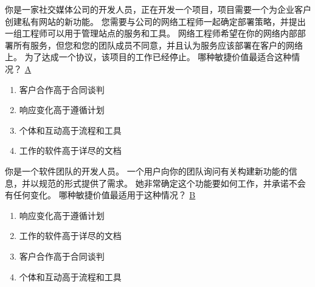 \begin{problem}
	你是一家社交媒体公司的开发人员，正在开发一个项目，项目需要一个为企业客户创建私有网站的新功能。 您需要与公司的网络工程师一起确定部署策略，并提出一组工程师可以用于管理站点的服务和工具。 网络工程师希望在你的网络内部部署所有服务，但您和您的团队成员不同意，并且认为服务应该部署在客户的网络上。 为了达成一个协议，该项目的工作已经停止。 哪种敏捷价值最适合这种情况？
	\uline{A}    
    \vspace{-0.8em}
    \begin{multicols}{2}
        \begin{enumerate}[label=\Alph*.]
            \item 客户合作高于合同谈判
            \item 响应变化高于遵循计划
            \item 个体和互动高于流程和工具
            \item 工作的软件高于详尽的文档
        \end{enumerate}
    \end{multicols}
    \vspace{-1em}
\end{problem}




\begin{problem}
	你是一个软件团队的开发人员。 一个用户向你的团队询问有关构建新功能的信息，并以规范的形式提供了需求。 她非常确定这个功能要如何工作，并承诺不会有任何变化。 哪种敏捷价值最适用于这种情况？
	\uline{B}    
    \vspace{-0.8em}
    \begin{multicols}{2}
        \begin{enumerate}[label=\Alph*.]
            \item 响应变化高于遵循计划
            \item 工作的软件高于详尽的文档
            \item 客户合作高于合同谈判
            \item 个体和互动高于流程和工具
        \end{enumerate}
    \end{multicols}
    \vspace{-1em}
\end{problem}




